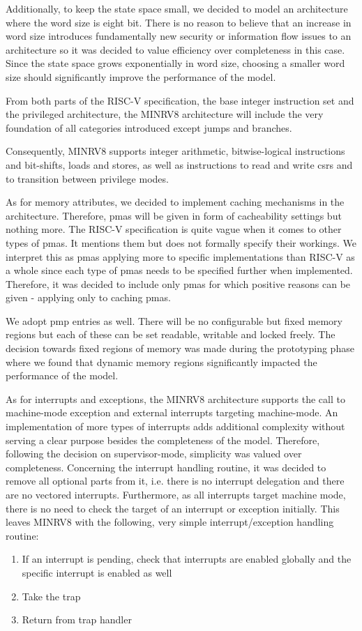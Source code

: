 Additionally, to keep the state space small, we decided to model an architecture where the word size is eight bit.
There is no reason to believe that an increase in word size introduces fundamentally new security or information flow issues to an architecture so it was decided to value efficiency over completeness in this case.
Since the state space grows exponentially in word size, choosing a smaller word size should significantly improve the performance of the model.

From both parts of the RISC-V specification, the base integer instruction set and the privileged architecture, the MINRV8 architecture will include the very foundation of all categories introduced except jumps and branches.

Consequently, MINRV8 supports integer arithmetic, bitwise-logical instructions and bit-shifts, loads and stores, as well as instructions to read and write \glspl{csr} and to transition between privilege modes.

As for memory attributes, we decided to implement caching mechanisms in the architecture.
Therefore, \glspl{pma} will be given in form of cacheability settings but nothing more.
The RISC-V specification is quite vague when it comes to other types of \glspl{pma}.
It mentions them but does not formally specify their workings.
We interpret this as \glspl{pma} applying more to specific implementations than RISC-V as a whole since each type of \glspl{pma} needs to be specified further when implemented.
Therefore, it was decided to include only \glspl{pma} for which positive reasons can be given - applying only to caching \glspl{pma}.

We adopt \gls{pmp} entries as well.
There will be no configurable but fixed memory regions but each of these can be set readable, writable and locked freely.
The decision towards fixed regions of memory was made during the prototyping phase where we found that dynamic memory regions significantly impacted the performance of the model.

As for interrupts and exceptions, the MINRV8 architecture supports the call to machine-mode exception and external interrupts targeting machine-mode.
An implementation of more types of interrupts adds additional complexity without serving a clear purpose besides the completeness of the model.
Therefore, following the decision on supervisor-mode, simplicity was valued over completeness.
Concerning the interrupt handling routine, it was decided to remove all optional parts from it, i.e. there is no interrupt delegation and there are no vectored interrupts.
Furthermore, as all interrupts target machine mode, there is no need to check the target of an interrupt or exception initially.
This leaves MINRV8 with the following, very simple interrupt/exception handling routine:
\begin{enumerate}
    \item If an interrupt is pending, check that interrupts are enabled globally and the specific interrupt is enabled as well
    \item Take the trap
    \item Return from trap handler
\end{enumerate}

